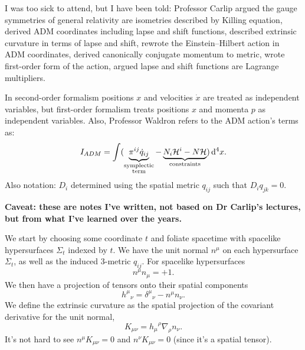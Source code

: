 \lecture

I was too sick to attend, but I have been told: Professor Carlip argued
the gauge symmetries of general relativity are isometries described by
Killing equation, derived ADM coordinates including lapse and shift
functions, described extrinsic curvature in terms of lapse and shift,
rewrote the Einstein--Hilbert action in ADM coordinates, derived canonically
conjugate momentum to metric, wrote first-order form of the action,
argued lapse and shift functions are Lagrange multipliers.

In second-order formalism positions $x$ and velocities $\dot{x}$ are treated as independent
variables, but first-order formalism treats positions $x$ and momenta $p$
as independent variables. Also, Professor Waldron refers to the ADM
action's terms as:
\begin{equation}
I_{ADM} = \int(\underbrace{\pi^{ij}\dot{q}_{ij}}_{\substack{\text{symplectic}\\\text{term}}}
- \underbrace{N_{i}\mathcal{H}^{i} - N\mathcal{H}}_{\text{constraints}})\,\mathrm{d}^{4}x.
\end{equation}
Also notation: $D_{i}$ determined using the spatial metric $q_{ij}$
such that $D_{i}q_{jk}=0$.

\textbf{Caveat: these are notes I've written, not based on Dr Carlip's lectures,
but from what I've learned over the years.}

We start by choosing some coordinate $t$ and foliate spacetime with
spacelike hypersurfaces $\Sigma_{t}$ indexed by $t$. We have the unit normal
$n^{\mu}$ on each hypersurface $\Sigma_{t}$, as well as the induced
3-metric $q_{ij}$. For spacelike hypersurfaces
\begin{equation}
n^{\mu}n_{\mu}=+1.
\end{equation}
We then have a projection of tensors onto their spatial components
\begin{equation}
{h^{\mu}}_{\nu} = {\delta^{\mu}}_{\nu} - n^{\mu}n_{\nu}.
\end{equation}
We define the extrinsic curvature as the spatial projection of the
covariant derivative for the unit normal,
\begin{equation}
K_{\mu\nu} = {h_{\mu}}^{\rho}\nabla_{\rho}n_{\nu}.
\end{equation}
It's not hard to see $n^{\mu}K_{\mu\nu}=0$ and $n^{\nu}K_{\mu\nu}=0$
(since it's a spatial tensor).

